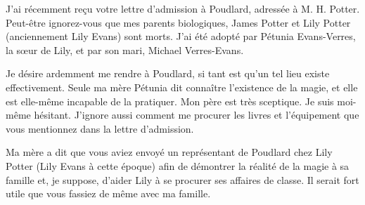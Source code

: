 \begin{writtenNote}


J'ai récemment reçu votre lettre d'admission à Poudlard, adressée à M. H. Potter. Peut-être ignorez-vous que mes parents biologiques, James Potter et Lily Potter (anciennement Lily Evans) sont morts. J'ai été adopté par Pétunia Evans-Verres, la sœur de Lily, et par son mari, Michael Verres-Evans.

Je désire ardemment me rendre à Poudlard, si tant est qu'un tel lieu existe effectivement. Seule ma mère Pétunia dit connaître l'existence de la magie, et elle est elle-même incapable de la pratiquer. Mon père est très sceptique. Je suis moi-même hésitant. J'ignore aussi comment me procurer les livres et l'équipement que vous mentionnez dans la lettre d'admission.

Ma mère a dit que vous aviez envoyé un représentant de Poudlard chez Lily Potter (Lily Evans à cette époque) afin de démontrer la réalité de la magie à sa famille et, je suppose, d'aider Lily à se procurer ses affaires de classe. Il serait fort utile que vous fassiez de même avec ma famille.

\end{writtenNote}


